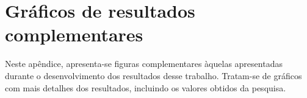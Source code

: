 \setcounter{figure}{0}

\chapter{Gráficos de resultados complementares}
\label{apendice}

\vspace{-1.9cm}

Neste apêndice, apresenta-se figuras complementares àquelas apresentadas durante o desenvolvimento dos resultados desse trabalho. Tratam-se de gráficos com mais detalhes dos resultados, incluindo os valores obtidos da pesquisa.


